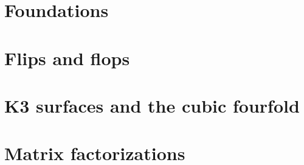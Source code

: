 \section{Foundations}


\section{Flips and flops}


\section{K3 surfaces and the cubic fourfold}


\section{Matrix factorizations}

